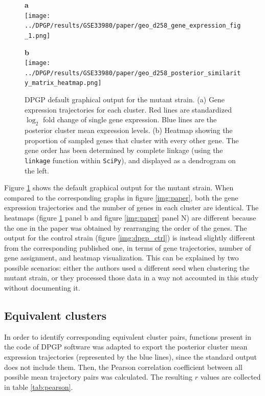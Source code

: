 \begin{figure}[!ht]
    \centering
    \parbox{.5\textwidth}{
        \textbf{a}\\
        \texttt{[image: ../DPGP/results/GSE33980/paper/geo\_d258\_gene\_expression\_fig\_1.png]}
    }
    \parbox{.45\textwidth}{
        \textbf{b}\\
        \texttt{[image: ../DPGP/results/GSE33980/paper/geo\_d258\_posterior\_similarity\_matrix\_heatmap.png]}
    }
    \caption[DPGP default output for the mutant strain]{DPGP default graphical output for the mutant strain. (a) Gene expression trajectories for each cluster. Red lines are standardized $\log_{2}$ fold change of single gene expression. Blue lines are the posterior cluster mean expression levels. (b) Heatmap showing the proportion of sampled genes that cluster with every other gene. The gene order has been determined by complete linkage (using the \texttt{linkage} function within \texttt{SciPy}), and displayed as a dendrogram on the left.}\label{img:dpgp_mut}
\end{figure}

Figure \ref{img:dpgp_mut} shows the default graphical output for the mutant strain. When compared to the corresponding graphs in figure \ref{img:paper}, both the gene expression trajectories and the number of genes in each cluster are identical. The heatmaps (figure \ref{img:dpgp_mut} panel b and figure \ref{img:paper} panel N) are different because the one in the paper was obtained by rearranging the order of the genes. The output for the control strain (figure \ref{img:dpgp_ctrl}) is instead slightly different from the corresponding published one, in terms of gene trajectories, number of gene assignment, and heatmap visualization. This can be explained by two possible scenarios: either the authors used a different seed when clustering the mutant strain, or they processed those data in a way not accounted in this study without documenting it.

\subsection{Equivalent clusters}\label{eq_clust}
In order to identify corresponding equivalent cluster pairs, functions present in the code of DPGP software was adapted to export the posterior cluster mean expression trajectories (represented by the blue lines), since the standard output does not include them. Then, the Pearson correlation coefficient between all possible mean trajectory pairs was calculated. The resulting $r$ values are collected in table \ref{tab:pearson}.

